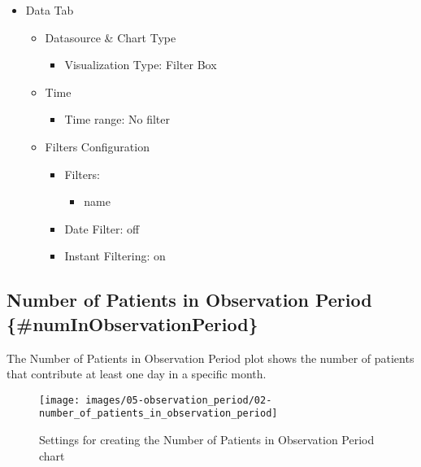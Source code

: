 \documentclass[
]{book}
\providecommand{\tightlist}{%
  \setlength{\itemsep}{0pt}\setlength{\parskip}{0pt}}
\begin{document}
\begin{itemize}
\tightlist
\item
  Data Tab

  \begin{itemize}
  \tightlist
  \item
    Datasource \& Chart Type

    \begin{itemize}
    \tightlist
    \item
      Visualization Type: Filter Box
    \end{itemize}
  \item
    Time

    \begin{itemize}
    \tightlist
    \item
      Time range: No filter
    \end{itemize}
  \item
    Filters Configuration

    \begin{itemize}
    \tightlist
    \item
      Filters:

      \begin{itemize}
      \tightlist
      \item
        name
      \end{itemize}
    \item
      Date Filter: off
    \item
      Instant Filtering: on
    \end{itemize}
  \end{itemize}
\end{itemize}

\hypertarget{number-of-patients-in-observation-period-numinobservationperiod}{%
\subsection*{Number of Patients in Observation Period \{\#numInObservationPeriod\}}\label{number-of-patients-in-observation-period-numinobservationperiod}}

The Number of Patients in Observation Period plot shows the number of patients that contribute at least one day in a specific month.

\begin{figure}
\texttt{[image: images/05-observation\_period/02-number\_of\_patients\_in\_observation\_period]} \caption{Settings for creating the Number of Patients in Observation Period chart}\label{fig:numPatientsInObserPeriod}
\end{figure}
\end{document}
